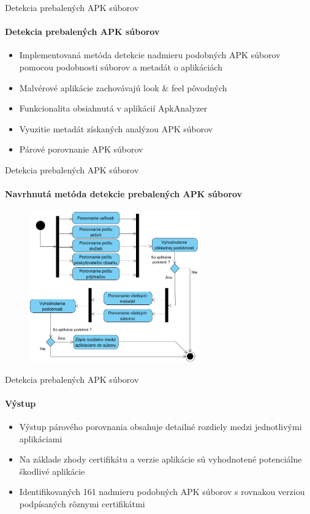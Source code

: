 \documentclass{beamer}
\begin{document}
  \begin{frame}[label=lists]{Detekcia prebalených APK súborov}
 	 \framesubtitle{Detekcia prebalených APK súborov}
	\begin{itemize}
	 	\item Implementovaná metóda detekcie nadmieru podobných APK súborov pomocou podobnosti súborov a metadát o aplikáciách
	 	\item Malvérové aplikácie zachovávajú look \& feel pôvodných
	 	\item Funkcionalita obsiahnutá v aplikácií ApkAnalyzer
	 	\item Vyuzitie metadát získaných analýzou APK súborov
	 	\item Párové porovnanie APK súborov
	\end{itemize}
  \end{frame} 

    \begin{frame}[label=lists]{Detekcia prebalených APK súborov}
 	 \framesubtitle{Navrhnutá metóda detekcie prebalených APK súborov}
	\begin{figure}[htb]
  \begin{center}
    \includegraphics[height=6.5cm]{images/diagram.jpg}
  \end{center}
\end{figure}
  \end{frame} 

  \begin{frame}[label=lists]{Detekcia prebalených APK súborov}
   \framesubtitle{Výstup}
	\begin{itemize}
	\item Výstup párového porovnania obsahuje detailné rozdiely medzi jednotlivými aplikáciami
	\item Na základe zhody certifikátu a verzie aplikácie sú vyhodnotené potenciálne škodlivé aplikácie
	\item Identifikovaných 161 nadmieru podobných APK súborov s rovnakou verziou podpísaných rôznymi certifikátmi
	\end{itemize}
	\end{frame}
\end{document}
